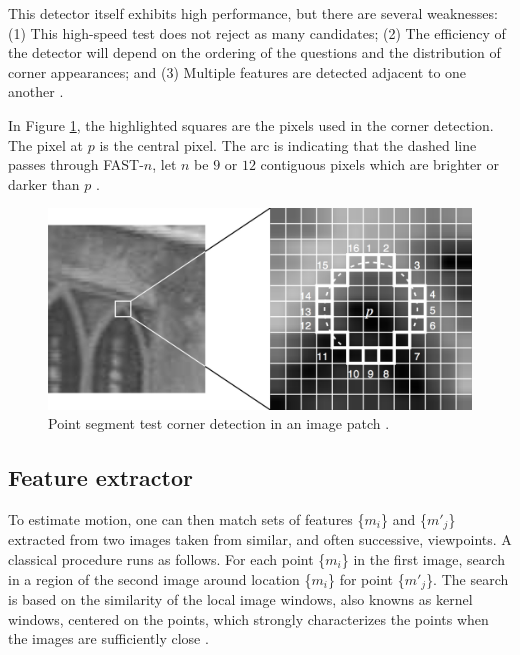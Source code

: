 This detector itself exhibits high performance, but there are several weaknesses: (1) This high-speed test does not reject as many candidates; (2) The efficiency of the detector will depend on the ordering of the questions and the distribution of corner appearances; and (3) Multiple features are detected adjacent to one another \cite{Rosten2010}.

In Figure \ref{figure:fast}, the highlighted squares are the pixels used in the corner detection. The pixel at $p$ is the central pixel. The arc is indicating that the dashed line passes through FAST-$n$, let $n$ be $9$ or $12$ contiguous pixels which are brighter or darker than $p$ \cite{Rosten2010}.

\begin{figure}[!htb]
  \centering
  \includegraphics[width=380pt]{chapters/tracking_library_for_the_web/fast.png}
  \caption{Point segment test corner detection in an image patch \cite{Glass2013}.}
  \label{figure:fast}
\end{figure}


\subsection{Feature extractor} %
\label{sub:tracking_library_for_the_web:marker_less_tracking_algorithm:feature_extractor}

To estimate motion, one can then match sets of features \{$m_{i}$\} and \{$m'_{j}$\} extracted from two images taken from similar, and often successive, viewpoints. A classical procedure \cite{Calonder2010} runs as follows. For each point \{$m_{i}$\} in the first image, search in a region of the second image around location \{$m_{i}$\} for point \{$m'_{j}$\}. The search is based on the similarity of the local image windows, also knowns as kernel windows, centered on the points, which strongly characterizes the points when the images are sufficiently close \cite{Lepetit2005}.

